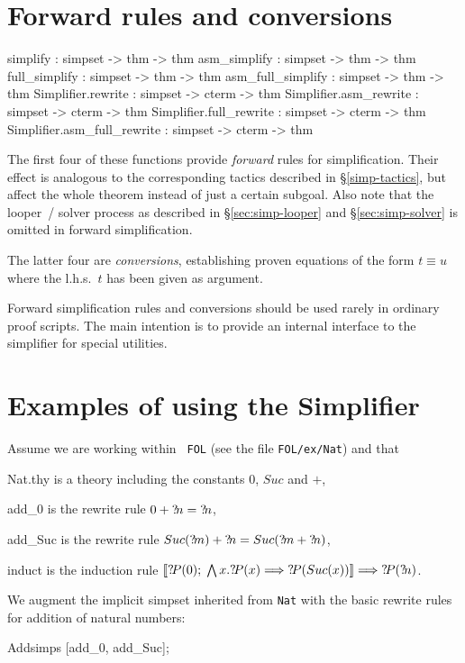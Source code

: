 \section{Forward rules and conversions}
\begin{ttbox}
simplify          : simpset -> thm -> thm
asm_simplify      : simpset -> thm -> thm
full_simplify     : simpset -> thm -> thm
asm_full_simplify : simpset -> thm -> thm\medskip
Simplifier.rewrite           : simpset -> cterm -> thm
Simplifier.asm_rewrite       : simpset -> cterm -> thm
Simplifier.full_rewrite      : simpset -> cterm -> thm
Simplifier.asm_full_rewrite  : simpset -> cterm -> thm
\end{ttbox}

The first four of these functions provide \emph{forward} rules for
simplification.  Their effect is analogous to the corresponding
tactics described in {\S}\ref{simp-tactics}, but affect the whole
theorem instead of just a certain subgoal.  Also note that the
looper~/ solver process as described in {\S}\ref{sec:simp-looper} and
{\S}\ref{sec:simp-solver} is omitted in forward simplification.

The latter four are \emph{conversions}, establishing proven equations
of the form $t \equiv u$ where the l.h.s.\ $t$ has been given as
argument.

\begin{warn}
  Forward simplification rules and conversions should be used rarely
  in ordinary proof scripts.  The main intention is to provide an
  internal interface to the simplifier for special utilities.
\end{warn}


\section{Examples of using the Simplifier}
 Assume we are working within {\tt
  FOL} (see the file \texttt{FOL/ex/Nat}) and that
\begin{ttdescription}
\item[Nat.thy] 
  is a theory including the constants $0$, $Suc$ and $+$,
\item[add_0]
  is the rewrite rule $0+{?\!n} = {?\!n}$,
\item[add_Suc]
  is the rewrite rule $Suc({?\!m})+{?\!n} = Suc({?\!m}+{?\!n})$,
\item[induct]
  is the induction rule $\mathopen{[\![}{?\!P}(0);\; \bigwedge x. {?\!P}(x)\Longrightarrow
    {?\!P}(Suc(x))\mathclose{]\!]} \Longrightarrow {?\!P}({?\!n})$.
\end{ttdescription}
We augment the implicit simpset inherited from \texttt{Nat} with the
basic rewrite rules for addition of natural numbers:
\begin{ttbox}
Addsimps [add_0, add_Suc];
\end{ttbox}

